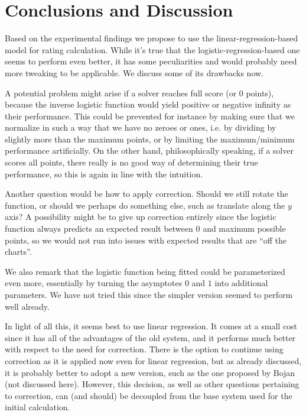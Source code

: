 \documentclass{article}
\begin{document}
\section{Conclusions and Discussion}
Based on the experimental findings we propose to use the linear-regression-based model for rating calculation.
While it's true that the logistic-regression-based one seems to perform even better, it has some peculiarities and would probably need more tweaking to be applicable.
We discuss some of its drawbacks now.

A potential problem might arise if a solver reaches full score (or 0 points), because the inverse logistic function would yield positive or negative infinity as their performance.
This could be prevented for instance by making sure that we normalize in such a way that we have no zeroes or ones, i.e. by dividing by slightly more than the maximum points, or by limiting the maximum/minimum performance artificially.
On the other hand, philosophically speaking, if a solver scores all points, there really is no good way of determining their true performance, so this is again in line with the intuition.

Another question would be how to apply correction.
Should we still rotate the function, or should we perhaps do something else, such as translate along the $y$ axis?
A possibility might be to give up correction entirely since the logistic function always predicts an expected result between $0$ and maximum possible points, so we would not run into issues with expected results that are ``off the charts''.

We also remark that the logistic function being fitted could be parameterized even more, essentially by turning the asymptotes $0$ and $1$ into additional parameters.
We have not tried this since the simpler version seemed to perform well already.

In light of all this, it seems best to use linear regression.
It comes at a small cost since it has all of the advantages of the old system, and it performs much better with respect to the need for correction.
There is the option to continue using correction as it is applied now even for linear regression, but as already discussed, it is probably better to adopt a new version, such as the one proposed by Bojan (not discussed here).
However, this decision, as well as other questions pertaining to correction, can (and should) be decoupled from the base system used for the initial calculation.
\end{document}

